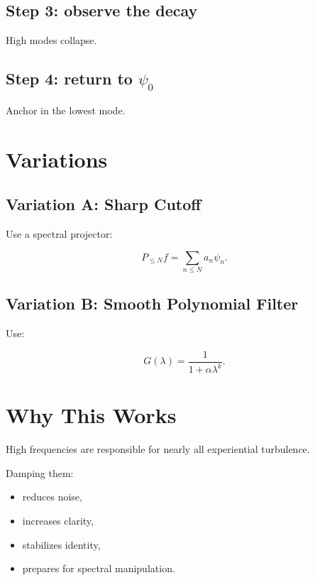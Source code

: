 \documentclass[12pt]{article}
\begin{document}
\subsection*{Step 3: observe the decay}

High modes collapse.

\subsection*{Step 4: return to $\psi_0$}

Anchor in the lowest mode.

\section{Variations}

\subsection{Variation A: Sharp Cutoff}

Use a spectral projector:

\[
P_{\le N} f = \sum_{n\le N} a_n \psi_n.
\]

\subsection{Variation B: Smooth Polynomial Filter}

Use:

\[
G(\lambda) = \frac{1}{1+\alpha\lambda^k}.
\]

\section{Why This Works}

High frequencies are responsible for nearly all experiential turbulence.

Damping them:

\begin{itemize}
    \item reduces noise,
    \item increases clarity,
    \item stabilizes identity,
    \item prepares for spectral manipulation.
\end{itemize}

\newpage
\end{document}
